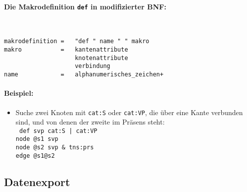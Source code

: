 \documentclass[12pt]{scrartcl}
\begin{document}
\paragraph*{Die Makrodefinition \texttt{def} in modifizierter BNF:}
~
\begin{framed}
\begin{lstlisting}
makrodefinition =   "def " name " " makro
makro           =   kantenattribute
                    knotenattribute
                    verbindung
name            =   alphanumerisches_zeichen+
\end{lstlisting}
\end{framed}


\paragraph*{Beispiel:}
\begin{itemize}
	\item Suche zwei Knoten mit \texttt{cat:S} oder \texttt{cat:VP}, die über eine Kante verbunden sind, und von denen der zweite im Präsens steht:\\
	{\tt
	def svp cat:S | cat:VP\\[-.4ex]
	node @s1 svp\\[-.4ex]
	node @s2 svp \& tns:prs\\[-.4ex]
	edge @s1@s2\\[-.4ex]
	}
\end{itemize}






\subsection{Datenexport}
\end{document}
